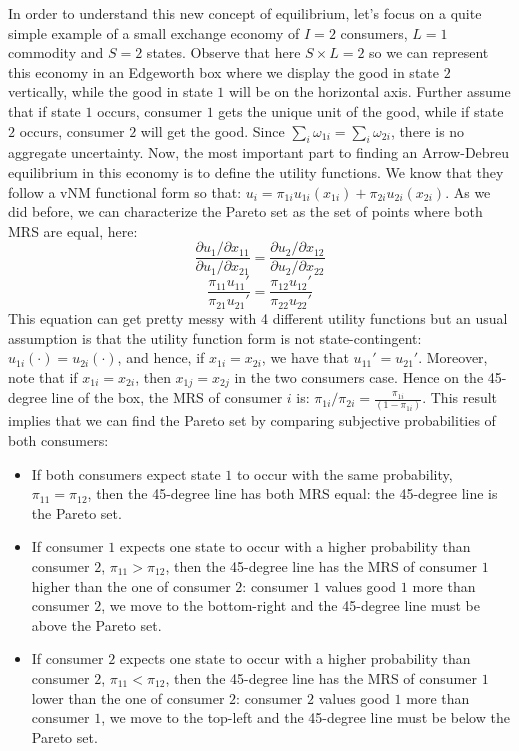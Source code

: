 \documentclass[12pt]{report}
\begin{document}
In order to understand this new concept of equilibrium, let's focus on a quite simple example of a small exchange economy of $I = 2$ consumers, $L = 1$ commodity and $S=2$ states. Observe that here $S\times L = 2$ so we can represent this economy in an Edgeworth box where we display the good in state $2$ vertically, while the good in state $1$ will be on the horizontal axis. Further assume that if state $1$ occurs, consumer $1$ gets the unique unit of the good, while if state $2$ occurs, consumer $2$ will get the good. Since $\sum_i \omega_{1i} = \sum_i \omega_{2i}$, there is no aggregate uncertainty. Now, the most important part to finding an Arrow-Debreu equilibrium in this economy is to define the utility functions. We know that they follow a vNM functional form so that: $u_i = \pi_{1i}u_{1i}(x_{1i}) + \pi_{2i}u_{2i}(x_{2i})$. As we did before, we can characterize the Pareto set as the set of points where both MRS are equal, here: $$\frac{\partial u_1/\partial x_{11}}{\partial u_1/\partial x_{21}} = \frac{\partial u_2/\partial x_{12}}{\partial u_2/\partial x_{22}}$$ 
$$\frac{\pi_{11}u_{11}'}{\pi_{21}u_{21}'} = \frac{\pi_{12}u_{12}'}{\pi_{22}u_{22}'}$$ This equation can get pretty messy with 4 different utility functions but an usual assumption is that the utility function form is not state-contingent: $u_{1i}(\cdot) = u_{2i}(\cdot)$, and hence, if $x_{1i} = x_{2i}$, we have that $u_{11}' = u_{21}'$. Moreover, note that if $x_{1i} = x_{2i}$, then $x_{1j} = x_{2j}$ in the two consumers case. Hence on the 45-degree line of the box, the MRS of consumer $i$ is: $\pi_{1i}/\pi_{2i} = \frac{\pi_{1i}}{(1 - \pi_{1i})}$. This result implies that we can find the Pareto set by comparing subjective probabilities of both consumers:\begin{itemize}
\item If both consumers expect state $1$ to occur with the same probability, $\pi_{11} = \pi_{12}$, then the 45-degree line has both MRS equal: the 45-degree line is the Pareto set.
\item If consumer $1$ expects one state to occur with a higher probability than consumer $2$, $\pi_{11} > \pi_{12}$, then the 45-degree line has the MRS of consumer $1$ higher than the one of consumer $2$: consumer $1$ values good $1$ more than consumer $2$, we move to the bottom-right and the 45-degree line must be above the Pareto set.
\item If consumer $2$ expects one state to occur with a higher probability than consumer $2$, $\pi_{11} < \pi_{12}$, then the 45-degree line has the MRS of consumer $1$ lower than the one of consumer $2$: consumer $2$ values good $1$ more than consumer $1$, we move to the top-left and the 45-degree line must be below the Pareto set.
\end{itemize}
\end{document}
